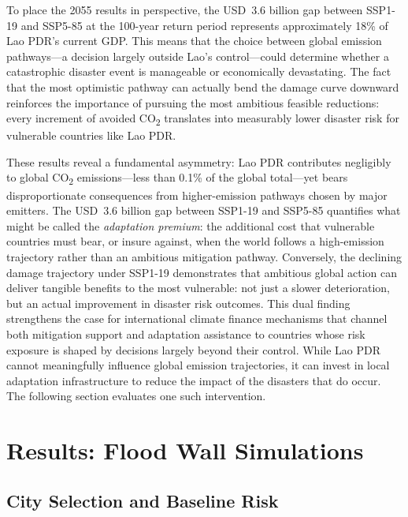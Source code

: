 \documentclass[11pt,a4paper]{article}
\begin{document}
To place the 2055 results in perspective, the USD~3.6 billion gap between SSP1-19 and SSP5-85 at the 100-year return period represents approximately 18\% of Lao PDR's current GDP. This means that the choice between global emission pathways---a decision largely outside Lao's control---could determine whether a catastrophic disaster event is manageable or economically devastating. The fact that the most optimistic pathway can actually bend the damage curve downward reinforces the importance of pursuing the most ambitious feasible reductions: every increment of avoided CO\textsubscript{2} translates into measurably lower disaster risk for vulnerable countries like Lao PDR.

These results reveal a fundamental asymmetry: Lao PDR contributes negligibly to global CO\textsubscript{2} emissions---less than 0.1\% of the global total---yet bears disproportionate consequences from higher-emission pathways chosen by major emitters. The USD~3.6 billion gap between SSP1-19 and SSP5-85 quantifies what might be called the \textit{adaptation premium}: the additional cost that vulnerable countries must bear, or insure against, when the world follows a high-emission trajectory rather than an ambitious mitigation pathway. Conversely, the declining damage trajectory under SSP1-19 demonstrates that ambitious global action can deliver tangible benefits to the most vulnerable: not just a slower deterioration, but an actual improvement in disaster risk outcomes. This dual finding strengthens the case for international climate finance mechanisms that channel both mitigation support and adaptation assistance to countries whose risk exposure is shaped by decisions largely beyond their control. While Lao PDR cannot meaningfully influence global emission trajectories, it can invest in local adaptation infrastructure to reduce the impact of the disasters that do occur. The following section evaluates one such intervention.

\section{Results: Flood Wall Simulations}

\subsection{City Selection and Baseline Risk}
\end{document}
